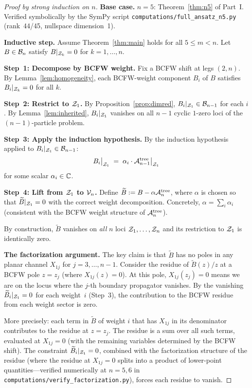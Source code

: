 \begin{proof}[Proof by strong induction on $n$]
\textbf{Base case.} $n = 5$: Theorem~\ref{thm:n5} of Part~I.
Verified symbolically by the SymPy script
\texttt{computations/full\_ansatz\_n5.py} (rank~44/45,
nullspace dimension~1).

\medskip
\noindent\textbf{Inductive step.} Assume Theorem~\ref{thm:main}
holds for all $5 \leq m < n$.
Let $B \in \mathcal{B}_n$ satisfy $B|_{\mathcal{Z}_k} = 0$ for
$k = 1, \ldots, n$.

\medskip
\noindent\textbf{Step~1: Decompose by BCFW weight.}
Fix a BCFW shift at legs $(2,n)$.
By Lemma~\ref{lem:homogeneity}, each BCFW-weight
component $B_i$ of $B$ satisfies
$B_i|_{\mathcal{Z}_k} = 0$ for all $k$.

\medskip
\noindent\textbf{Step~2: Restrict to $\mathcal{Z}_1$.}
By Proposition~\ref{prop:dimred},
$B_i|_{\mathcal{Z}_1} \in \mathcal{B}_{n-1}$ for each $i$.
By Lemma~\ref{lem:inherited}, $B_i|_{\mathcal{Z}_1}$ vanishes
on all $n-1$ cyclic $1$-zero loci of the $(n-1)$-particle
problem.

\medskip
\noindent\textbf{Step~3: Apply the induction hypothesis.}
By the induction hypothesis applied to $B_i|_{\mathcal{Z}_1}
\in \mathcal{B}_{n-1}$:
\[
  B_i\big|_{\mathcal{Z}_1} \;=\; \alpha_i \cdot
  \mathcal{A}_{n-1}^{\mathrm{tree}}\big|_{\mathcal{Z}_1}
\]
for some scalar $\alpha_i \in \mathbb{C}$.

\medskip
\noindent\textbf{Step~4: Lift from $\mathcal{Z}_1$ to $\mathcal{V}_n$.}
Define $\widetilde{B} := B - \alpha \mathcal{A}_n^{\mathrm{tree}}$,
where $\alpha$ is chosen so that $\widetilde{B}|_{\mathcal{Z}_1} = 0$
with the correct weight decomposition. Concretely,
$\alpha = \sum_i \alpha_i$ (consistent with the BCFW
weight structure of $\mathcal{A}_n^{\mathrm{tree}}$).

By construction, $\widetilde{B}$ vanishes on \emph{all}
$n$ loci $\mathcal{Z}_1, \ldots, \mathcal{Z}_n$ and its restriction to
$\mathcal{Z}_1$ is identically zero.

\textbf{The factorization argument.}
The key claim is that $\widetilde{B}$ has no poles in any
planar channel $X_{1j}$ for $j = 3, \ldots, n-1$.
Consider the residue of $\widetilde{B}(z)/z$ at a BCFW
pole $z = z_j$ (where $X_{1j}(z) = 0$). At this pole,
$X_{1j}(z_j) = 0$ means we are on the locus where the
$j$-th boundary propagator vanishes. By the vanishing
$\widetilde{B}_i|_{\mathcal{Z}_1} = 0$ for each weight~$i$
(Step~3), the contribution to the BCFW residue from each
weight sector is zero.

More precisely: each term in $\widetilde{B}$ of weight $i$
that has $X_{1j}$ in its denominator contributes to the
residue at $z = z_j$. The residue is a sum over all such
terms, evaluated at $X_{1j} = 0$ (with the remaining
variables determined by the BCFW shift). The constraint
$\widetilde{B}_i|_{\mathcal{Z}_1} = 0$, combined with the
factorization structure of the residue (where the residue
at $X_{1j} = 0$ splits into a product of lower-point
quantities---verified numerically at $n = 5, 6$ in
\texttt{computations/verify\_factorization.py}), forces
each residue to vanish.


\end{proof}
